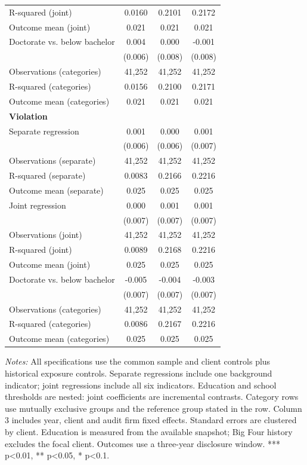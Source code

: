 \documentclass[10pt]{article}
\begin{document}
\begin{minipage}{19cm}
\begin{threeparttable}
\begin{tabular}{p{}ccc}
R-squared (joint) & 0.0160 & 0.2101 & 0.2172 \\
Outcome mean (joint) & 0.021 & 0.021 & 0.021 \\
Doctorate vs. below bachelor & 0.004 & 0.000 & -0.001 \\
 & (0.006) & (0.008) & (0.008) \\
Observations (categories) & 41,252 & 41,252 & 41,252 \\
R-squared (categories) & 0.0156 & 0.2100 & 0.2171 \\
Outcome mean (categories) & 0.021 & 0.021 & 0.021 \\
\multicolumn{4}{l}{\textbf{Violation}} \\
Separate regression & 0.001 & 0.000 & 0.001 \\
 & (0.006) & (0.006) & (0.007) \\
Observations (separate) & 41,252 & 41,252 & 41,252 \\
R-squared (separate) & 0.0083 & 0.2166 & 0.2216 \\
Outcome mean (separate) & 0.025 & 0.025 & 0.025 \\
Joint regression & 0.000 & 0.001 & 0.001 \\
 & (0.007) & (0.007) & (0.007) \\
Observations (joint) & 41,252 & 41,252 & 41,252 \\
R-squared (joint) & 0.0089 & 0.2168 & 0.2216 \\
Outcome mean (joint) & 0.025 & 0.025 & 0.025 \\
Doctorate vs. below bachelor & -0.005 & -0.004 & -0.003 \\
 & (0.007) & (0.007) & (0.007) \\
Observations (categories) & 41,252 & 41,252 & 41,252 \\
R-squared (categories) & 0.0086 & 0.2167 & 0.2216 \\
Outcome mean (categories) & 0.025 & 0.025 & 0.025 \\
\bottomrule
\end{tabular}
\begin{tablenotes}\fontsize{9}{11}\selectfont
\item \raggedright \fontsize{9}{11}\selectfont \textit{Notes:} All specifications use the common sample and client controls plus historical exposure controls. Separate regressions include one background indicator; joint regressions include all six indicators. Education and school thresholds are nested: joint coefficients are incremental contrasts. Category rows use mutually exclusive groups and the reference group stated in the row. Column 3 includes year, client and audit firm fixed effects. Standard errors are clustered by client. Education is measured from the available snapshot; Big Four history excludes the focal client. Outcomes use a three-year disclosure window. *** p<0.01, ** p<0.05, * p<0.1.
\end{tablenotes}
\end{threeparttable}

\end{minipage}
\end{document}
